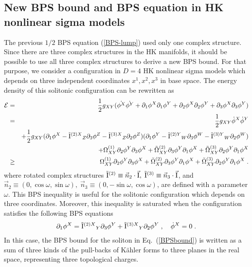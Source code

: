 \documentclass[a4paper,12pt]{article}
\newcommand{\kahler}{K\"{a}hler }
\begin{document}
\subsection{New BPS bound and BPS equation in HK nonlinear sigma models}
The previous $1/2$ BPS equation (\ref{BPS-lump}) used only one complex 
structure. 
Since there are three complex structures in the HK manifolds, it should be 
possible to use all three complex structures to derive a new BPS bound. 
 For that purpose, we consider a configuration in $D=4$ HK nonlinear 
 sigma models which depends on three 
independent coordinates $x^1, x^2, x^3$ in base space. 
The energy density of this solitonic configuration can be rewritten as 
\begin{eqnarray}
  {\cal E} &=& \frac{1}{2}g_{XY}(\dot{\phi^X}\dot{\phi^Y}
                + \partial_1\phi^X\partial_1\phi^Y 
                + \partial_2\phi^X\partial_2\phi^Y 
                + \partial_3\phi^X\partial_3\phi^Y) 
                \nonumber \\
        &=& \frac{1}{2}g_{XY}\dot{\phi}^X\dot{\phi}^Y \nonumber \\
        &{}&   + \frac{1}{2}g_{XY}
               (\partial_1\phi^X - {\tilde{\rm I}}^{(2)X}{}_Z \partial_3\phi^Z
                 - {\tilde{\rm I}}^{(3)X}{}_Z \partial_2\phi^Z)
               (\partial_1\phi^Y - {\tilde{\rm I}}^{(2)Y}{}_W \partial_3\phi^W
                 - {\tilde{\rm I}}^{(3)Y}{}_W \partial_2\phi^W) \nonumber \\
        &{}&   +\Omega^{(1)}_{XY}\partial_2\phi^Y\partial_3\phi^X 
               + \tilde{\Omega}^{(2)}_{XY}\partial_3\phi^Y\partial_1\phi^X 
               + \tilde{\Omega}^{(3)}_{XY}\partial_2\phi^Y\partial_1\phi^X \nonumber \\      
        &\ge & \Omega^{(1)}_{XY}\partial_2\phi^Y\partial_3\phi^X 
               + \tilde{\Omega}^{(2)}_{XY}\partial_3\phi^Y\partial_1\phi^X 
               + \tilde{\Omega}^{(3)}_{XY}\partial_2\phi^Y\partial_1\phi^X\;. 
           \label{BPSbound}
\end{eqnarray}
where rotated complex structures $\tilde{\rm I}^{(2)}\equiv \vec{n}_2\cdot \vec{\rm I},\;
\tilde{\rm I}^{(3)}\equiv \vec{n}_3\cdot \vec{\rm I}$, and 
$\vec{n}_2\equiv (0, \cos\omega, \sin\omega),\;
\vec{n}_3\equiv (0, -\sin\omega, \cos\omega)$, are defined with a parameter $\omega$. 
This BPS inequality is useful 
for the solitonic configuration which depends on three coordinates. 
Moreover, this inequality is saturated when the configuration satisfies 
the following BPS equations 
\begin{eqnarray}
\partial_1\phi^X = {\tilde{\rm I}}^{(2)X}{}_Y \partial_3\phi^Y
                 + {\tilde{\rm I}}^{(3)X}{}_Y \partial_2\phi^Y
\; , \quad \dot{\phi}^X=0 \; .
  \label{BPSeq-int}
\end{eqnarray} 
In this case, 
the BPS bound for the soliton in Eq.~(\ref{BPSbound}) is written as 
a sum of three kinds of the pull-backs of \kahler forms 
to three planes in the real space, 
representing three topological charges. 
\end{document}
